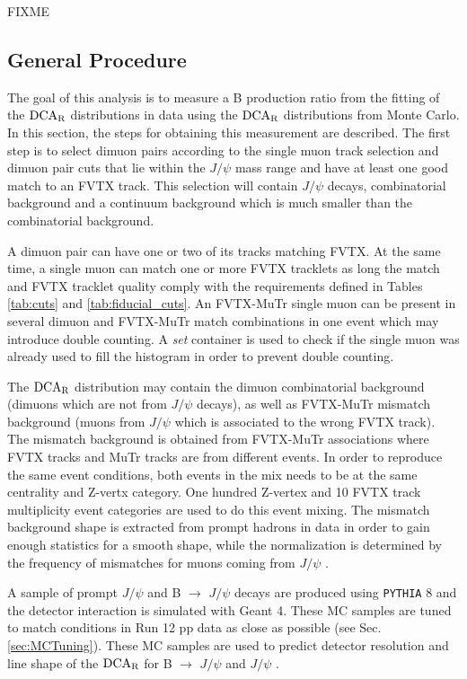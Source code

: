 \documentclass[12pt]{article}
\newcommand{\jpsi}{$J/\psi$ }
\newcommand{\pythia}{\texttt{PYTHIA} }
\newcommand{\dcar}{$\rm{DCA}_{R}$ }
\begin{document}
{\color{red}FIXME}

\subsection{General Procedure}
The goal of this analysis is to measure a B production ratio from the fitting of the \dcar distributions
in data using the \dcar distributions from Monte Carlo.  In this section, the steps for obtaining this measurement are described.
The first step is to select dimuon pairs according to the single muon track selection and dimuon pair cuts that lie within the 
\jpsi mass range and have at least one good match to an FVTX track. This selection will contain \jpsi decays, combinatorial background 
and a continuum background which is much smaller than the combinatorial background.

A dimuon pair can have one or two of its tracks matching FVTX. At the same time, a single muon can match one or 
more FVTX tracklets as long the match and FVTX tracklet quality comply with the requirements defined in Tables \ref{tab:cuts} and \ref{tab:fiducial_cuts}.
 An FVTX-MuTr single muon can be present in several dimuon and FVTX-MuTr match combinations in one event which may introduce double counting.
 A \textit{set} container is used to check if the single muon was already used to fill the histogram in order to prevent double counting.

The \dcar distribution may contain the dimuon combinatorial background (dimuons which are not from \jpsi decays), as well as FVTX-MuTr mismatch 
background (muons from \jpsi which is associated to the wrong FVTX track). The mismatch background is obtained from FVTX-MuTr associations 
where FVTX tracks and MuTr tracks are from different events. In order to reproduce the same event conditions, both events in the mix needs to be 
at the same centrality and Z-vertx category. One hundred Z-vertex and 10 FVTX track multiplicity event categories are used to do this event mixing. 
The mismatch background shape is extracted from prompt hadrons in data in order to gain enough statistics for a smooth shape, while the normalization 
is determined by the frequency of mismatches for muons coming from \jpsi.

A sample of prompt \jpsi and B $\to$ \jpsi decays are produced using \pythia 8 and the detector interaction is simulated with Geant 4. 
These MC samples are tuned to match conditions in Run 12 pp data as close as possible (see Sec. \ref{sec:MCTuning}).  These MC samples 
are used to predict detector resolution and line shape of the \dcar for B $\to$ \jpsi and \jpsi.
\end{document}
